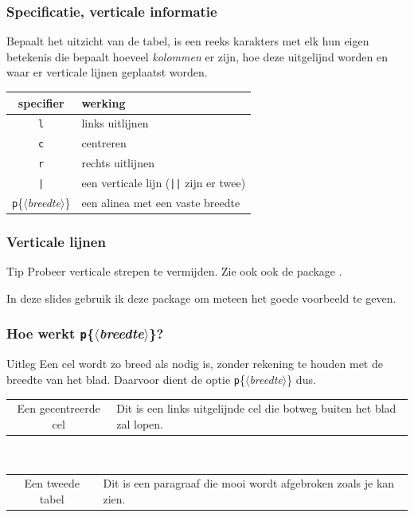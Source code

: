 \begin{frame}
  \frametitle{Specificatie, verticale informatie}

  Bepaalt het uitzicht van de tabel, is een reeks karakters met elk hun eigen betekenis die bepaalt hoeveel \emph{kolommen} er zijn, hoe deze uitgelijnd worden en waar er verticale lijnen geplaatst worden. \\[1em]

  \begin{tabular}{cl}
    specifier & werking \\\midrule
    \texttt{l} & links uitlijnen \\
    \texttt{c} & centreren \\
    \texttt{r} & rechts uitlijnen \\
    \texttt{|} & een verticale lijn (\texttt{||} zijn er twee) \\
    \texttt{p}\{$\langle$\textsl{breedte}$\rangle$\} & een alinea met een vaste breedte
  \end{tabular}
\end{frame}

\begin{frame}
  \frametitle{Verticale lijnen}

  \begin{alertblock}{Tip}
    Probeer verticale strepen te vermijden. Zie ook ook de package .
  \end{alertblock}

  In deze slides gebruik ik deze package om meteen het goede voorbeeld te geven.
\end{frame}

\begin{frame}
  \frametitle{Hoe werkt \texttt{p}\{$\langle$\textsl{breedte}$\rangle$\}?}

  \begin{exampleblock}{Uitleg}
  Een cel wordt zo breed als nodig is, zonder rekening te houden met de breedte van het blad. Daarvoor dient de optie \texttt{p}\{$\langle$\textsl{breedte}$\rangle$\} dus.
\end{exampleblock}

  \begin{tabular}{cl}
    Een gecentreerde cel & Dit is een links uitgelijnde cel die botweg buiten het blad zal lopen. \\
  \end{tabular} \\[1em]
  \begin{tabular}{cp{}}
    Een tweede tabel & Dit is een paragraaf die mooi wordt afgebroken zoals je kan zien. \\
  \end{tabular}
\end{frame}


